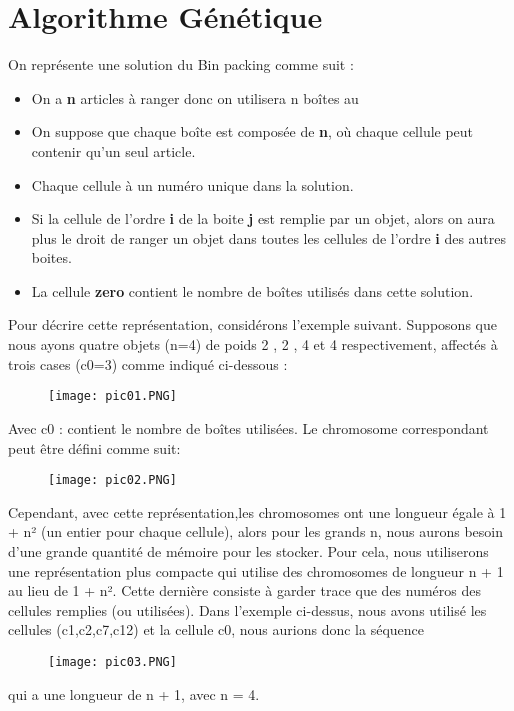 \documentclass{report}
\begin{document}
\section{Algorithme Génétique}
On représente une solution du Bin packing comme suit : 
\begin{itemize}
	\item On a \textbf{n} articles à ranger donc on utilisera n boîtes au 
	\item On suppose que chaque boîte est composée de \textbf{n}, où chaque cellule peut contenir qu’un seul article.
	\item Chaque cellule à un numéro unique dans la solution.
	\item Si la cellule de l’ordre \textbf{i} de la boite \textbf{j} est remplie par un objet, alors on aura plus le droit de ranger un objet dans toutes les cellules de l’ordre \textbf{i} des autres boites.
	\item La cellule \textbf{zero} contient le nombre de boîtes utilisés dans cette solution.
\end{itemize}
Pour décrire cette représentation, considérons l'exemple suivant. Supposons que nous ayons quatre objets (n=4) de poids 2 , 2 , 4 et 4 respectivement, affectés à trois cases (c0=3)  comme indiqué ci-dessous :
\begin{figure}[H]
  \texttt{[image: pic01.PNG]}
\end{figure}
Avec c0 : contient le nombre de boîtes utilisées.
\newline
Le chromosome correspondant peut être défini comme suit:
\begin{figure}[H]
  \texttt{[image: pic02.PNG]}
\end{figure}
Cependant, avec cette représentation,les chromosomes ont une longueur égale à 1 + n² (un entier pour chaque cellule), alors pour les grands n, nous aurons besoin d'une grande quantité de mémoire pour les stocker.
Pour cela, nous utiliserons une représentation plus compacte qui utilise des chromosomes de longueur n + 1 au lieu de 1 + n². Cette dernière consiste à garder trace que des numéros des cellules remplies (ou utilisées).
\newline
Dans l'exemple ci-dessus, nous avons utilisé les cellules (c1,c2,c7,c12) et la cellule c0, nous aurions donc la séquence 
\begin{figure}[H]
  \texttt{[image: pic03.PNG]}
\end{figure}
qui a une longueur de n + 1, avec n = 4. 
\newline
\end{document}
